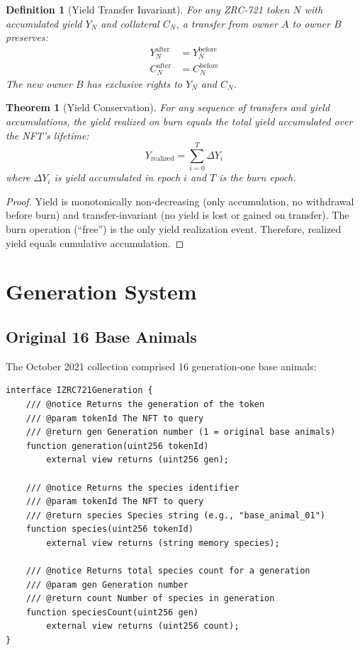\documentclass[11pt,letterpaper]{article}
\newtheorem{theorem}{Theorem}[section]
\newtheorem{definition}{Definition}[section]
\begin{document}
\begin{definition}[Yield Transfer Invariant]
For any ZRC-721 token $N$ with accumulated yield $Y_N$ and collateral $C_N$, a transfer from owner $A$ to owner $B$ preserves:
\begin{align}
Y_N^{\text{after}} &= Y_N^{\text{before}} \\
C_N^{\text{after}} &= C_N^{\text{before}}
\end{align}
The new owner $B$ has exclusive rights to $Y_N$ and $C_N$.
\end{definition}

\begin{theorem}[Yield Conservation]
For any sequence of transfers and yield accumulations, the yield realized on burn equals the total yield accumulated over the NFT's lifetime:
\[
Y_{\text{realized}} = \sum_{i=0}^{T} \Delta Y_i
\]
where $\Delta Y_i$ is yield accumulated in epoch $i$ and $T$ is the burn epoch.
\end{theorem}

\begin{proof}
Yield is monotonically non-decreasing (only accumulation, no withdrawal before burn) and transfer-invariant (no yield is lost or gained on transfer). The burn operation (``free'') is the only yield realization event. Therefore, realized yield equals cumulative accumulation.
\end{proof}

\section{Generation System}
\label{sec:generation}

\subsection{Original 16 Base Animals}

The October 2021 collection comprised 16 generation-one base animals:

\begin{lstlisting}[language=Solidity,caption=ZRC-721 Generation Interface]
interface IZRC721Generation {
    /// @notice Returns the generation of the token
    /// @param tokenId The NFT to query
    /// @return gen Generation number (1 = original base animals)
    function generation(uint256 tokenId)
        external view returns (uint256 gen);

    /// @notice Returns the species identifier
    /// @param tokenId The NFT to query
    /// @return species Species string (e.g., "base_animal_01")
    function species(uint256 tokenId)
        external view returns (string memory species);

    /// @notice Returns total species count for a generation
    /// @param gen Generation number
    /// @return count Number of species in generation
    function speciesCount(uint256 gen)
        external view returns (uint256 count);
}
\end{lstlisting}
\end{document}
